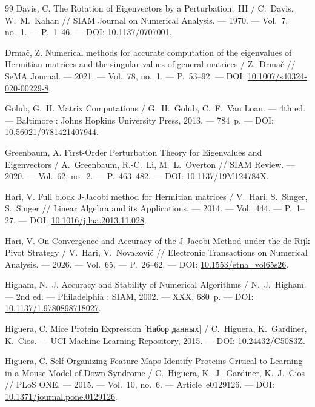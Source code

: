 \documentclass[a4paper,12pt]{article}
\theoremstyle{csstyle}
\begin{document}
\begin{thebibliography}{99}
Davis, C.
The Rotation of Eigenvectors by a Perturbation.~III /
C.~Davis, W.~M.~Kahan //
SIAM Journal on Numerical Analysis. --- 1970. ---
Vol.~7, no.~1. --- P.~1--46. ---
DOI: \href{https://doi.org/10.1137/0707001}{10.1137/0707001}.

Drma\v{c}, Z.
Numerical methods for accurate computation of the eigenvalues of
Hermitian matrices and the singular values of general matrices /
Z.~Drma\v{c} //
SeMA Journal. --- 2021. --- Vol.~78, no.~1. --- P.~53--92. ---
DOI: \href{https://doi.org/10.1007/s40324-020-00229-8}{10.1007/s40324-020-00229-8}.

Golub, G.~H.
Matrix Computations / G.~H.~Golub, C.~F.~Van Loan. ---
4th ed. --- Baltimore : Johns Hopkins University Press, 2013. ---
784~p. ---
DOI: \href{https://doi.org/10.56021/9781421407944}{10.56021/9781421407944}.

Greenbaum, A.
First-Order Perturbation Theory for Eigenvalues and Eigenvectors /
A.~Greenbaum, R.-C.~Li, M.~L.~Overton //
SIAM Review. --- 2020. --- Vol.~62, no.~2. --- P.~463--482. ---
DOI: \href{https://doi.org/10.1137/19M124784X}{10.1137/19M124784X}.

Hari, V.
Full block J-Jacobi method for Hermitian matrices /
V.~Hari, S.~Singer, S.~Singer //
Linear Algebra and its Applications. --- 2014. ---
Vol.~444. --- P.~1--27. ---
DOI: \href{https://doi.org/10.1016/j.laa.2013.11.028}{10.1016/j.laa.2013.11.028}.

Hari, V.
On Convergence and Accuracy of the J-Jacobi Method under the de Rijk
Pivot Strategy / V.~Hari, V.~Novakovi\'c //
Electronic Transactions on Numerical Analysis. --- 2026. ---
Vol.~65. --- P.~26--62. ---
DOI: \href{https://doi.org/10.1553/etna_vol65s26}{10.1553/etna\_vol65s26}.

Higham, N.~J.
Accuracy and Stability of Numerical Algorithms / N.~J.~Higham. ---
2nd ed. --- Philadelphia : SIAM, 2002. --- XXX, 680~p. ---
DOI: \href{https://doi.org/10.1137/1.9780898718027}{10.1137/1.9780898718027}.

Higuera, C.
Mice Protein Expression [Набор данных] / C.~Higuera, K.~Gardiner, K.~Cios. ---
UCI Machine Learning Repository, 2015. ---
DOI: \href{https://doi.org/10.24432/C50S3Z}{10.24432/C50S3Z}.

Higuera, C.
Self-Organizing Feature Maps Identify Proteins Critical to Learning in a
Mouse Model of Down Syndrome / C.~Higuera, K.~J.~Gardiner, K.~J.~Cios //
PLoS ONE. --- 2015. --- Vol.~10, no.~6. --- Article~e0129126. ---
DOI: \href{https://doi.org/10.1371/journal.pone.0129126}
{10.1371/journal.pone.0129126}.


\end{thebibliography}
\end{document}
